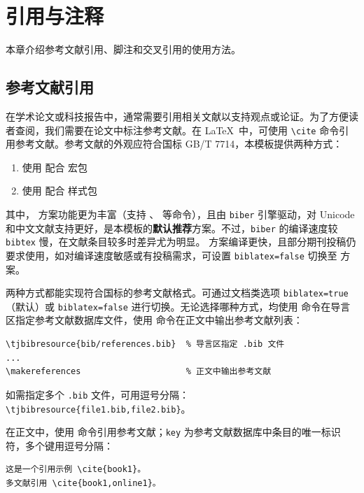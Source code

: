 \chapter{引用与注释}\label{chap:reference}

本章介绍参考文献引用、脚注和交叉引用的使用方法。

\section{参考文献引用}

在学术论文或科技报告中，通常需要引用相关文献以支持观点或论证。为了方便读者查阅，我们需要在论文中标注参考文献。在 \LaTeX\ 中，可使用 \verb|\cite| 命令引用参考文献。参考文献的外观应符合国标 GB/T 7714，本模板提供两种方式：
\begin{enumerate}
    \item 使用 \BibTeX{} 配合  宏包
    \item 使用 \BibLaTeX{} 配合  样式包
\end{enumerate}
其中，\BibLaTeX{} 方案功能更为丰富（支持 、 等命令），且由 \texttt{biber} 引擎驱动，对 Unicode 和中文文献支持更好，是本模板的\textbf{默认推荐}方案。不过，\texttt{biber} 的编译速度较 \texttt{bibtex} 慢，在文献条目较多时差异尤为明显。\BibTeX{} 方案编译更快，且部分期刊投稿仍要求使用，如对编译速度敏感或有投稿需求，可设置 \texttt{biblatex=false} 切换至 \BibTeX{} 方案。

两种方式都能实现符合国标的参考文献格式。可通过文档类选项 \texttt{biblatex=true}（默认）或 \texttt{biblatex=false} 进行切换。无论选择哪种方式，均使用  命令在导言区指定参考文献数据库文件，使用  命令在正文中输出参考文献列表：

\begin{Verbatim}
\tjbibresource{bib/references.bib}  % 导言区指定 .bib 文件
...
\makereferences                     % 正文中输出参考文献
\end{Verbatim}

如需指定多个 \texttt{.bib} 文件，可用逗号分隔：\verb|\tjbibresource{file1.bib,file2.bib}|。

在正文中，使用  命令引用参考文献；\verb|key| 为参考文献数据库中条目的唯一标识符，多个键用逗号分隔：

\begin{Verbatim}
这是一个引用示例 \cite{book1}。
多文献引用 \cite{book1,online1}。
\end{Verbatim}

